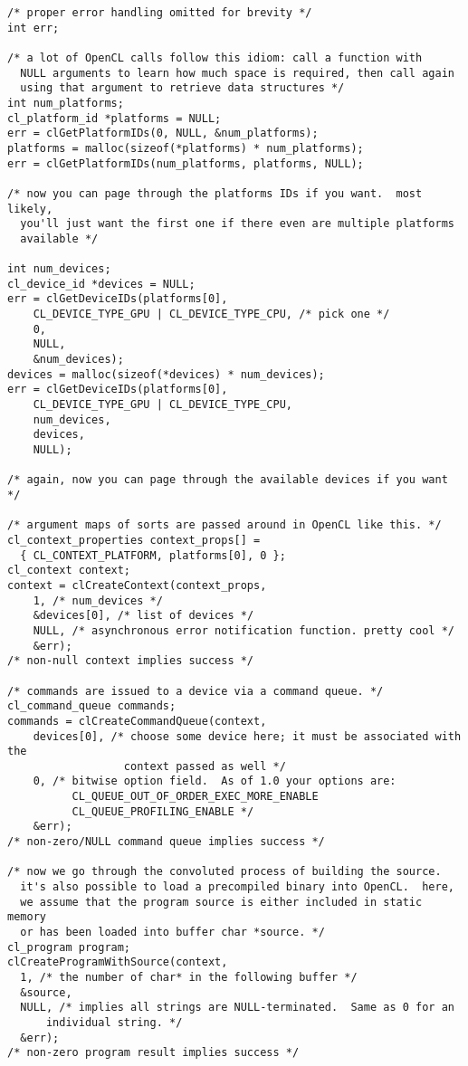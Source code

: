 \documentclass{article}
\begin{document}
\begin{verbatim}
/* proper error handling omitted for brevity */
int err;

/* a lot of OpenCL calls follow this idiom: call a function with
  NULL arguments to learn how much space is required, then call again
  using that argument to retrieve data structures */
int num_platforms;
cl_platform_id *platforms = NULL;
err = clGetPlatformIDs(0, NULL, &num_platforms);
platforms = malloc(sizeof(*platforms) * num_platforms);
err = clGetPlatformIDs(num_platforms, platforms, NULL);

/* now you can page through the platforms IDs if you want.  most likely,
  you'll just want the first one if there even are multiple platforms
  available */

int num_devices;
cl_device_id *devices = NULL;
err = clGetDeviceIDs(platforms[0], 
    CL_DEVICE_TYPE_GPU | CL_DEVICE_TYPE_CPU, /* pick one */
    0,
    NULL,
    &num_devices);
devices = malloc(sizeof(*devices) * num_devices);
err = clGetDeviceIDs(platforms[0],
    CL_DEVICE_TYPE_GPU | CL_DEVICE_TYPE_CPU,
    num_devices,
    devices,
    NULL);

/* again, now you can page through the available devices if you want */

/* argument maps of sorts are passed around in OpenCL like this. */
cl_context_properties context_props[] = 
  { CL_CONTEXT_PLATFORM, platforms[0], 0 };
cl_context context;
context = clCreateContext(context_props, 
    1, /* num_devices */
    &devices[0], /* list of devices */
    NULL, /* asynchronous error notification function. pretty cool */
    &err);
/* non-null context implies success */

/* commands are issued to a device via a command queue. */
cl_command_queue commands;
commands = clCreateCommandQueue(context,
    devices[0], /* choose some device here; it must be associated with the
                  context passed as well */
    0, /* bitwise option field.  As of 1.0 your options are:
          CL_QUEUE_OUT_OF_ORDER_EXEC_MORE_ENABLE
          CL_QUEUE_PROFILING_ENABLE */
    &err);
/* non-zero/NULL command queue implies success */

/* now we go through the convoluted process of building the source.
  it's also possible to load a precompiled binary into OpenCL.  here, 
  we assume that the program source is either included in static memory
  or has been loaded into buffer char *source. */
cl_program program;
clCreateProgramWithSource(context,
  1, /* the number of char* in the following buffer */
  &source,
  NULL, /* implies all strings are NULL-terminated.  Same as 0 for an
      individual string. */
  &err);
/* non-zero program result implies success */
 

\end{verbatim}
\end{document}
